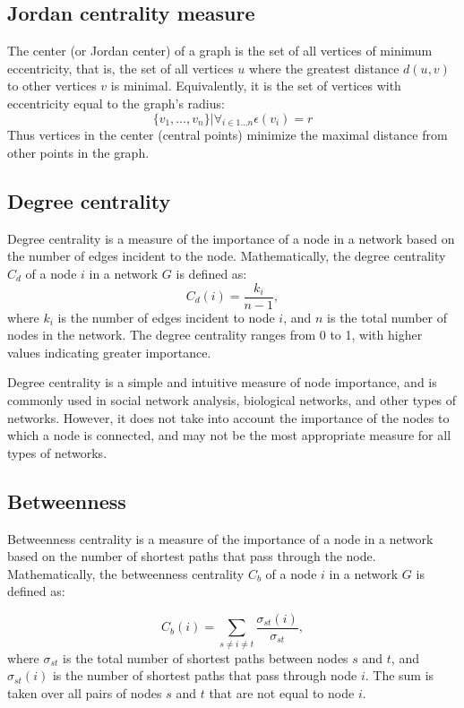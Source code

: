 \subsection{Jordan centrality measure}

The center (or Jordan center) of a graph is the set of all vertices of minimum eccentricity, that is, the set of all vertices $u$ where the greatest distance $d(u,v)$ to other vertices $v$ is minimal. Equivalently, it is the set of vertices with eccentricity equal to the graph's radius:
\[ \{ v_1,\ldots,v_n \} | \forall_{i\in 1\ldots n} \epsilon (v_i) = r \]
Thus vertices in the center (central points) minimize the maximal distance from other points in the graph. 

\subsection{Degree centrality}
Degree centrality is a measure of the importance of a node in a network based on the number of edges incident to the node. Mathematically, the degree centrality $C_d$ of a node $i$ in a network $G$ is defined as:
\begin{equation}
    C_d(i) = \frac{k_i}{n-1},
\end{equation}
where $k_i$ is the number of edges incident to node $i$, and $n$ is the total number of nodes in the network. The degree centrality ranges from 0 to 1, with higher values indicating greater importance.

Degree centrality is a simple and intuitive measure of node importance, and is commonly used in social network analysis, biological networks, and other types of networks. However, it does not take into account the importance of the nodes to which a node is connected, and may not be the most appropriate measure for all types of networks.


\subsection{Betweenness}

Betweenness centrality is a measure of the importance of a node in a network based on the number of shortest paths that pass through the node. Mathematically, the betweenness centrality $C_b$ of a node $i$ in a network $G$ is defined as:

\begin{equation}
    C_b(i) = \sum_{s \neq i \neq t} \frac{\sigma_{st}(i)}{\sigma_{st}},
\end{equation}
where $\sigma_{st}$ is the total number of shortest paths between nodes $s$ and $t$, and $\sigma_{st}(i)$ is the number of shortest paths that pass through node $i$. The sum is taken over all pairs of nodes $s$ and $t$ that are not equal to node $i$. 

